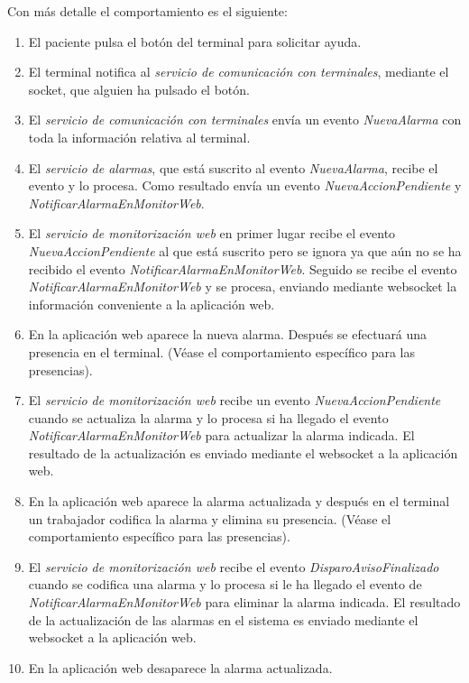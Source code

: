Con más detalle el comportamiento es el siguiente:
\begin{enumerate}
	\item El paciente pulsa el botón del terminal para solicitar ayuda.	
	\item El terminal notifica al \textit{servicio de comunicación con terminales}, mediante el socket, que alguien ha pulsado el botón.
	\item El \textit{servicio de comunicación con terminales} envía un evento \textit{NuevaAlarma} con toda la información relativa al terminal.
	\item El \textit{servicio de alarmas}, que está suscrito al evento \textit{NuevaAlarma}, recibe el evento y lo procesa. Como resultado envía un evento \textit{NuevaAccionPendiente} y \textit{NotificarAlarmaEnMonitorWeb}.
	\item El \textit{servicio de monitorización web} en primer lugar recibe el evento \textit{NuevaAccionPendiente} al que está suscrito pero se ignora ya que aún no se ha recibido el evento \textit{NotificarAlarmaEnMonitorWeb}. Seguido se recibe el evento \textit{NotificarAlarmaEnMonitorWeb} y se procesa, enviando mediante websocket la información conveniente a la aplicación web.
	\item En la aplicación web aparece la nueva alarma. Después se efectuará una presencia en el terminal. (Véase el comportamiento específico para las presencias).
	\item El \textit{servicio de monitorización web} recibe un evento \textit{NuevaAccionPendiente} cuando se actualiza la alarma y lo procesa si ha llegado el evento \textit{NotificarAlarmaEnMonitorWeb} para actualizar la alarma indicada. El resultado de la actualización es enviado mediante el websocket a la aplicación web.
	\item En la aplicación web aparece la alarma actualizada y después en el terminal un trabajador codifica la alarma y elimina su presencia. (Véase el comportamiento específico para las presencias).
	\item El \textit{servicio de monitorización web} recibe el evento \textit{DisparoAvisoFinalizado} cuando se codifica una alarma y lo procesa si le ha llegado el evento de \textit{NotificarAlarmaEnMonitorWeb} para eliminar la alarma indicada. El resultado de la actualización de las alarmas en el sistema es enviado mediante el websocket a la aplicación web.
	\item En la aplicación web desaparece la alarma actualizada.
\end{enumerate}


